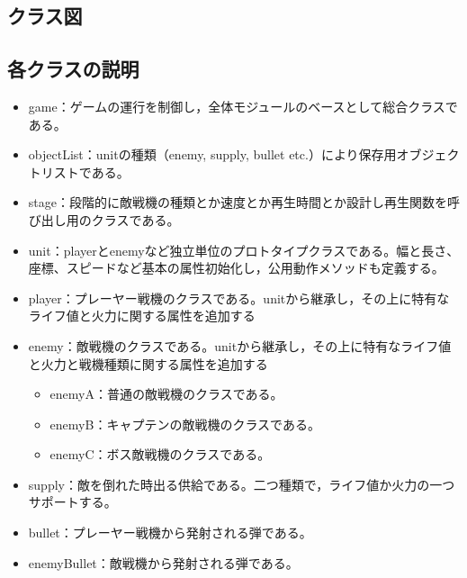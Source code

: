 \subsection{クラス図}
\subsection{各クラスの説明}
	\begin{itemize}
		\item game：ゲームの運行を制御し，全体モジュールのベースとして総合クラスである。
		\item objectList：unitの種類（enemy, supply, bullet etc.）により保存用オブジェクトリストである。
		\item stage：段階的に敵戦機の種類とか速度とか再生時間とか設計し再生関数を呼び出し用のクラスである。
		\item unit：playerとenemyなど独立単位のプロトタイプクラスである。幅と長さ、座標、スピードなど基本の属性初始化し，公用動作メソッドも定義する。
		\item player：プレーヤー戦機のクラスである。unitから継承し，その上に特有なライフ値と火力に関する属性を追加する
		\item enemy：敵戦機のクラスである。unitから継承し，その上に特有なライフ値と火力と戦機種類に関する属性を追加する
			\begin{itemize}
				\item enemyA：普通の敵戦機のクラスである。
				\item enemyB：キャプテンの敵戦機のクラスである。
				\item enemyC：ボス敵戦機のクラスである。
			\end{itemize}
		\item supply：敵を倒れた時出る供給である。二つ種類で，ライフ値か火力の一つサポートする。
		\item bullet：プレーヤー戦機から発射される弾である。
		\item enemyBullet：敵戦機から発射される弾である。
	\end{itemize}